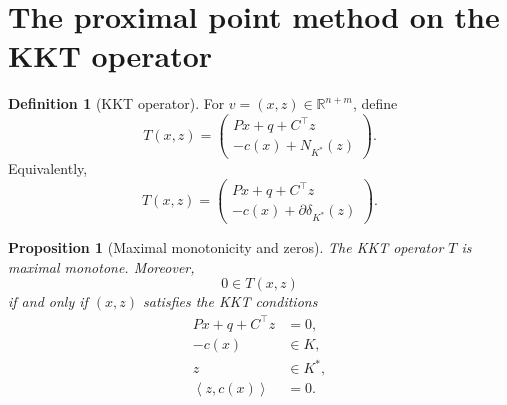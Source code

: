 \documentclass[a4paper,11pt]{book}
\theoremstyle{plain}
\newtheorem{proposition}[theorem]{Proposition}
\theoremstyle{definition}
\newtheorem{definition}[theorem]{Definition}
\theoremstyle{remark}
\numberwithin{equation}{chapter}
\numberwithin{algorithm}{chapter}
\newcommand{\R}{\mathbb{R}}
\newcommand{\inner}[2]{\left\langle #1, #2 \right\rangle}
\begin{document}
	\section{The proximal point method on the KKT operator}
	
	\begin{definition}[KKT operator]
		For \(v=(x,z)\in\R^{n+m}\), define
		\begin{equation}
			T(x,z)
			=
			\begin{pmatrix}
				Px+q+C^\top z\\[1mm]
				-c(x)+N_{K^*}(z)
			\end{pmatrix}.
			\label{eq:kkt-operator}
		\end{equation}
		Equivalently,
		\[
		T(x,z)
		=
		\begin{pmatrix}
			Px+q+C^\top z\\[1mm]
			-c(x)+\partial\delta_{K^*}(z)
		\end{pmatrix}.
		\]
	\end{definition}
	
	\begin{proposition}[Maximal monotonicity and zeros]
		The KKT operator \(T\) is maximal monotone. Moreover,
		\[
		0\in T(x,z)
		\]
		if and only if \((x,z)\) satisfies the KKT conditions
		\begin{align}
			Px+q+C^\top z&=0,\\
			-c(x)&\in K,\\
			z&\in K^*,\\
			\inner{z}{c(x)}&=0.
		\end{align}
	\end{proposition}
	
\end{document}
